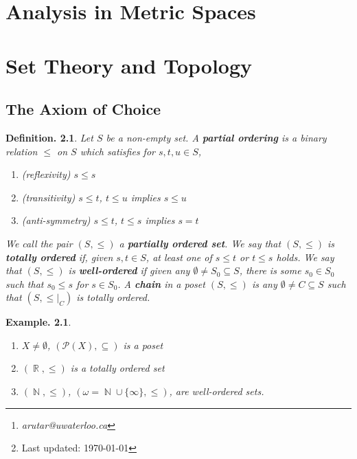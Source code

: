 \documentclass[11pt, a4paper]{memoir}
\title{\subject}
\author{Alex Rutar\thanks{\itshape arutar@uwaterloo.ca}\\ University of Waterloo}
\date{\semester\thanks{Last updated: \today}}
\DeclareMathOperator{\N}{{\mathbb{N}}}
\DeclareMathOperator{\R}{{\mathbb{R}}}
\theoremstyle{change}
\theoremstyle{plain}
\theoremstyle{nonumberplain}
\newtheorem{definition}{Definition.}
\newtheorem{example}{Example.}
\numberwithin{equation}{section}
\begin{document}
\hypersetup{pageanchor=false}
\maketitle
\newpage
\frontmatter
\hypersetup{pageanchor=true}
\tableofcontents*
\newpage
\mainmatter


\chapter{Analysis in Metric Spaces}
\chapter{Set Theory and Topology}
\section{The Axiom of Choice}
\begin{definition}
    Let $S$ be a non-empty set.
    A \textbf{partial ordering} is a binary relation $\leq$ on $S$ which satisfies for $s,t,u\in S$,
    \begin{enumerate}[nl,r]
        \item \textit{(reflexivity)} $s\leq s$
        \item \textit{(transitivity)} $s\leq t$, $t\leq u$ implies $s\leq u$
        \item \textit{(anti-symmetry)} $s\leq t$, $t\leq s$ implies $s=t$
    \end{enumerate}
    We call the pair $(S,\leq)$ a \textbf{partially ordered set}.
    We say that $(S,\leq)$ is \textbf{totally ordered} if, given $s,t\in S$, at least one of $s\leq t$ or $t\leq s$ holds.
    We say that $(S,\leq)$ is \textbf{well-ordered} if given any $\emptyset\neq S_0\subseteq S$, there is some $s_0\in S_0$ such that $s_0\leq s$ for $s\in S_0$.
    A \textbf{chain} in a poset $(S,\leq)$ is any $\emptyset\neq C\subseteq S$ such that $(S,\leq|_C)$ is totally ordered.
\end{definition}
\begin{example}
    \begin{enumerate}[nl,r]
        \item $X\neq\emptyset$, $(\mathcal{P}(X),\subseteq)$ is a poset
        \item $(\R,\leq)$ is a totally ordered set
        \item $(\N,\leq)$, $(\omega=\N\cup\{\infty\},\leq)$, are well-ordered sets.
    \end{enumerate}
\end{example}
\end{document}
